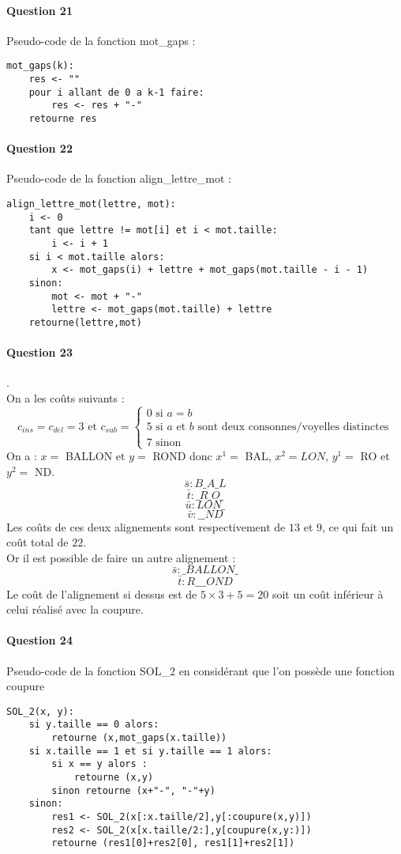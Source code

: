 
\paragraph{Question 21}
Pseudo-code de la fonction mot\_gaps :
\begin{lstlisting}
mot_gaps(k):
    res <- ""
    pour i allant de 0 a k-1 faire:
        res <- res + "-"
    retourne res
\end{lstlisting}
\paragraph{Question 22}
Pseudo-code de la fonction align\_lettre\_mot :
\begin{lstlisting}
align_lettre_mot(lettre, mot):
    i <- 0
    tant que lettre != mot[i] et i < mot.taille:
        i <- i + 1
    si i < mot.taille alors:
        x <- mot_gaps(i) + lettre + mot_gaps(mot.taille - i - 1)
    sinon:
        mot <- mot + "-"
        lettre <- mot_gaps(mot.taille) + lettre
    retourne(lettre,mot)

\end{lstlisting}

\paragraph{Question 23}.\\
On a les coûts suivants :
$$c_{ins} = c_{del} = 3 \text{ et } c_{sub} = \left \{
    \begin{array}{l}
        0 \text{ si } a = b\\
        5 \text{ si } a\text{ et }b \text{ sont deux consonnes/voyelles distinctes}\\
        7 \text{ sinon }
    \end{array}
\right.$$
On a : $x = $ BALLON et $y = $ ROND donc $x^1 = $ BAL, $x^2 = LON$, $y^1 = $ RO et $y^2 = $ ND.
$$\bar s : B\_A\_L$$
$$\bar t : \_R\_O\_$$
$$\bar u : LON\_$$
$$\bar v : \_\_ND$$
Les coûts de ces deux alignements sont respectivement de $13$ et $9$, ce qui fait un coût total de $22$.\\
Or il est possible de faire un autre alignement :
$$\bar s : \_BALLON\_$$
$$\bar t : R\_\_\_OND$$
Le coût de l'alignement si dessus est de $5\times 3 + 5 = 20$ soit un coût inférieur à celui réalisé avec la coupure.

\paragraph{Question 24}
Pseudo-code de la fonction SOL\_2 en considérant que l'on possède une fonction coupure
\begin{lstlisting}
SOL_2(x, y):
    si y.taille == 0 alors:
        retourne (x,mot_gaps(x.taille))
    si x.taille == 1 et si y.taille == 1 alors:
        si x == y alors :
            retourne (x,y)
        sinon retourne (x+"-", "-"+y)
    sinon:
        res1 <- SOL_2(x[:x.taille/2],y[:coupure(x,y)])
        res2 <- SOL_2(x[x.taille/2:],y[coupure(x,y:)])
        retourne (res1[0]+res2[0], res1[1]+res2[1])
\end{lstlisting}
